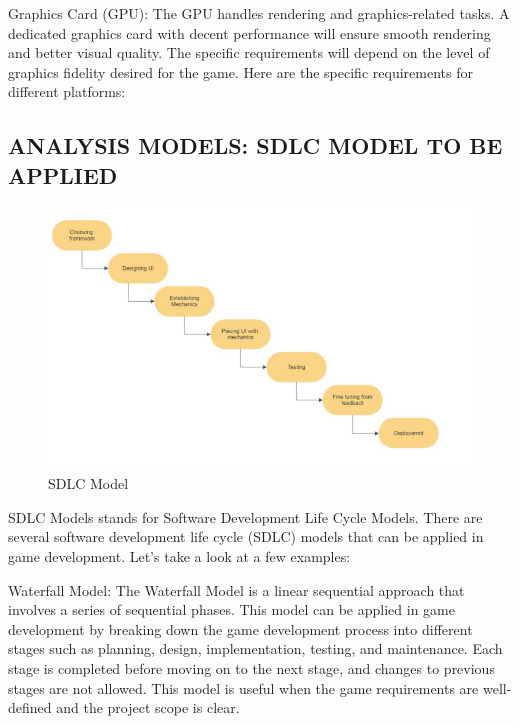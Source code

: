 \documentclass[12pt]{report}
\begin{document}
Graphics Card (GPU): The GPU handles rendering and graphics-related tasks. A dedicated graphics card with decent performance will ensure smooth rendering and better visual quality. The specific requirements will depend on the level of graphics fidelity desired for the game.
Here are the specific requirements for different platforms:



\centering
\raggedright
\subsection{  ANALYSIS MODELS: SDLC MODEL TO BE APPLIED}

\justifying
\setlength{\parindent}{4em}
\setlength{\parskip}{0.5em}
\renewcommand{\baselinestretch}{1.5}

\vspace{2cm}
\begin{figure}[h]
\centering
\includegraphics[scale=0.9]{Class Diagram.png}
\caption{SDLC Model}
\label{SDLC}
\end{figure}

\normalsize
SDLC Models stands for Software Development Life Cycle Models.
There are several software development life cycle (SDLC) models that can be applied in game development.
Let's take a look at a few examples:

Waterfall Model: The Waterfall Model is a linear sequential approach that involves a series of sequential phases. This model can be applied in game development by breaking down the game development process into different stages such as planning, design, implementation, testing, and maintenance. Each stage is completed before moving on to the next stage, and changes to previous stages are not allowed. This model is useful when the game requirements are well-defined and the project scope is clear.
\end{document}
